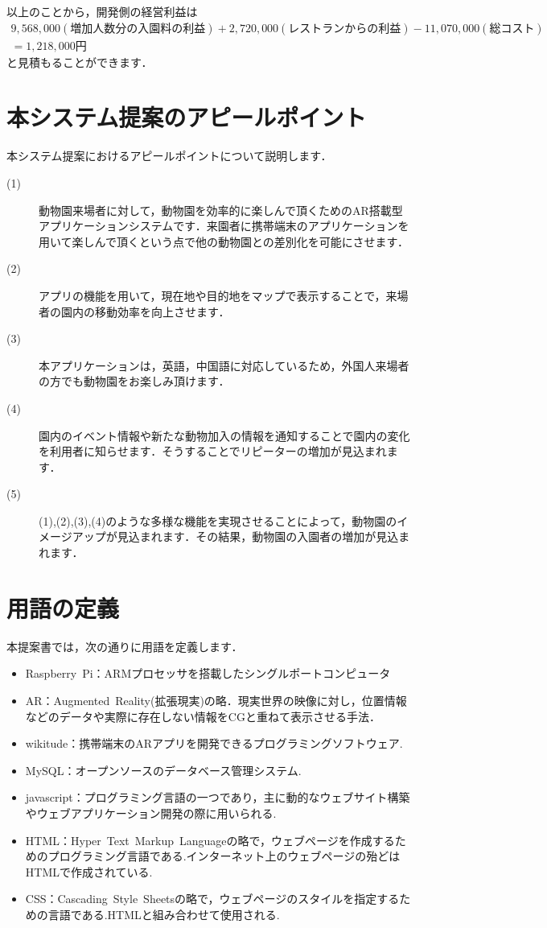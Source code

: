 \documentclass[a4j]{jarticle}
\begin{document}
以上のことから，開発側の経営利益は
\begin{eqnarray*}
9,568,000(増加人数分の入園料の利益)+2,720,000(レストランからの利益)-11,070,000(総コスト)\\
=1,218,000円
\end{eqnarray*}
と見積もることができます．
\section{本システム提案のアピールポイント}
本システム提案におけるアピールポイントについて説明します．
\begin{description}
\item[(1)] 動物園来場者に対して，動物園を効率的に楽しんで頂くためのAR搭載型アプリケーションシステムです．来園者に携帯端末のアプリケーションを用いて楽しんで頂くという点で他の動物園との差別化を可能にさせます．
\item[(2)] アプリの機能を用いて，現在地や目的地をマップで表示することで，来場者の園内の移動効率を向上させます．
\item[(3)] 本アプリケーションは，英語，中国語に対応しているため，外国人来場者の方でも動物園をお楽しみ頂けます．
\item[(4)] 園内のイベント情報や新たな動物加入の情報を通知することで園内の変化を利用者に知らせます．そうすることでリピーターの増加が見込まれます．
\item[(5)] (1),(2),(3),(4)のような多様な機能を実現させることによって，動物園のイメージアップが見込まれます．その結果，動物園の入園者の増加が見込まれます．
\end{description}

\section{用語の定義}
  本提案書では，次の通りに用語を定義します．
\begin{itemize}
\item Raspberry~Pi：ARMプロセッサを搭載したシングルポートコンピュータ
\item AR：Augmented~Reality(拡張現実)の略．現実世界の映像に対し，位置情報などのデータや実際に存在しない情報をCGと重ねて表示させる手法．
\item wikitude：携帯端末のARアプリを開発できるプログラミングソフトウェア.
\item MySQL：オープンソースのデータベース管理システム.
\item javascript：プログラミング言語の一つであり，主に動的なウェブサイト構築やウェブアプリケーション開発の際に用いられる.
\item HTML：Hyper~Text~Markup~Languageの略で，ウェブページを作成するためのプログラミング言語である.インターネット上のウェブページの殆どはHTMLで作成されている.
\item CSS：Cascading~Style~Sheetsの略で，ウェブページのスタイルを指定するための言語である.HTMLと組み合わせて使用される.
\end{itemize}
\end{document}

